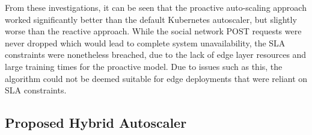 From these investigations, it can be seen that the proactive auto-scaling approach worked significantly better than the default Kubernetes autoscaler, but slightly worse than the reactive approach. While the social network POST requests were never dropped which would lead to complete system unavailability, the SLA constraints were nonetheless breached, due to the lack of edge layer resources and large training times for the proactive model. Due to issues such as this, the algorithm could not be deemed suitable for edge deployments that were reliant on SLA constraints.\par

\subsection {Proposed Hybrid Autoscaler}
\label{subsec:ch6-hybrid-algo}

